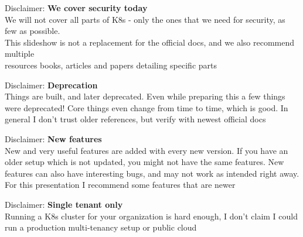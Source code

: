 \documentclass[Screen16to9,17pt]{foils}
\begin{document}
\begin{list2}
\item Disclaimer: {\bf We cover security today}\\
We will not cover all parts of K8s  - only the ones that we need for security, as few as possible.\\
This slideshow is not a replacement for the official docs, and we also recommend multiple\\ resources books, articles and papers detailing specific parts

\item Disclaimer: {\bf Deprecation}\\
Things are built, and later deprecated. Even while preparing this a few things were deprecated! Core things even change from time to time, which is good. In general I don't trust older references, but verify with newest official docs

\item Disclaimer: {\bf New features}\\
New and very useful features are added with every new version. If you have an older setup which is not updated, you might not have the same features. New features can also have interesting bugs, and may not work as intended right away. For this presentation I recommend some features that are newer

\item Disclaimer: {\bf Single tenant only}\\
Running a K8s cluster for your organization is hard enough, I don't claim I could run a production multi-tenancy setup or public cloud
\end{list2}

\end{document}
